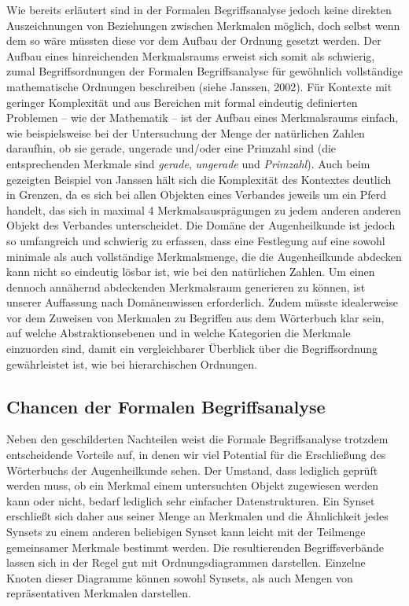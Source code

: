 \documentclass[pagesize,paper=A4,DIV=calc,fontsize=12pt,draft=false]{scrreprt}
\begin{document}
Wie bereits erläutert sind in der Formalen Begriffsanalyse jedoch keine direkten Auszeichnungen von Beziehungen zwischen Merkmalen möglich, doch selbst wenn dem so wäre müssten diese vor dem Aufbau der Ordnung gesetzt werden. 
Der Aufbau eines hinreichenden Merkmalsraums erweist sich somit als schwierig, zumal Begriffsordnungen der Formalen Begriffsanalyse für gewöhnlich vollständige mathematische Ordnungen beschreiben (siehe Janssen, 2002). 
Für Kontexte mit geringer Komplexität und aus Bereichen mit formal eindeutig definierten Problemen -- wie der Mathematik -- ist der Aufbau eines Merkmalsraums einfach, wie beispielsweise bei der Untersuchung der Menge der natürlichen Zahlen daraufhin, ob sie gerade, ungerade und/oder eine Primzahl sind (die entsprechenden Merkmale sind \emph{gerade}, \emph{ungerade} und \emph{Primzahl}). 
Auch beim gezeigten Beispiel von Janssen hält sich die Komplexität des Kontextes deutlich in Grenzen, da es sich bei allen Objekten eines Verbandes jeweils um ein Pferd handelt, das sich in maximal 4 Merkmalsausprägungen zu jedem anderen anderen Objekt des Verbandes unterscheidet. 
Die Domäne der Augenheilkunde ist jedoch so umfangreich und schwierig zu erfassen, dass eine Festlegung auf eine sowohl minimale als auch vollständige Merkmalsmenge, die die Augenheilkunde abdecken kann nicht so eindeutig lösbar ist, wie bei den natürlichen Zahlen. 
Um einen dennoch annähernd abdeckenden Merkmalsraum generieren zu können, ist unserer Auffassung nach Domänenwissen erforderlich. 
Zudem müsste idealerweise vor dem Zuweisen von Merkmalen zu Begriffen aus dem Wörterbuch klar sein, auf welche Abstraktionsebenen und in welche Kategorien die Merkmale einzuorden sind, damit ein vergleichbarer Überblick über die Begriffsordnung gewährleistet ist, wie bei hierarchischen Ordnungen. 

\subsection{Chancen der Formalen Begriffsanalyse}

Neben den geschilderten Nachteilen weist die Formale Begriffsanalyse trotzdem entscheidende Vorteile auf, in denen wir viel Potential für die Erschließung des Wörterbuchs der Augenheilkunde sehen. 
Der Umstand, dass lediglich geprüft werden muss, ob ein Merkmal einem untersuchten Objekt zugewiesen werden kann oder nicht, bedarf lediglich sehr einfacher Datenstrukturen.
Ein Synset erschließt sich daher aus seiner Menge an Merkmalen und die Ähnlichkeit jedes Synsets zu einem anderen beliebigen Synset kann leicht mit der Teilmenge gemeinsamer Merkmale bestimmt werden.
Die resultierenden Begriffsverbände lassen sich in der Regel gut mit Ordnungsdiagrammen darstellen.
Einzelne Knoten dieser Diagramme können sowohl Synsets, als auch Mengen von repräsentativen Merkmalen darstellen. 
\end{document}
